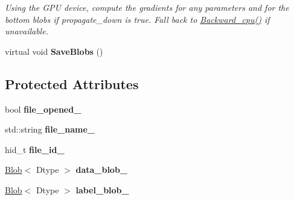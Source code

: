 \begin{DoxyCompactItemize}
\begin{DoxyCompactList}\small\item\em Using the G\+PU device, compute the gradients for any parameters and for the bottom blobs if propagate\+\_\+down is true. Fall back to \hyperlink{classcaffe_1_1HDF5OutputLayer_aaf5106f73266c501ebbb231df988f52a}{Backward\+\_\+cpu()} if unavailable. \end{DoxyCompactList}\item 
virtual void {\bfseries Save\+Blobs} ()\hypertarget{classcaffe_1_1HDF5OutputLayer_a56c7ba8e69d0867d550dddd928863a2f}{}\label{classcaffe_1_1HDF5OutputLayer_a56c7ba8e69d0867d550dddd928863a2f}

\end{DoxyCompactItemize}
\subsection*{Protected Attributes}
\begin{DoxyCompactItemize}
\item 
bool {\bfseries file\+\_\+opened\+\_\+}\hypertarget{classcaffe_1_1HDF5OutputLayer_a995b7eadf9ccd19c02a7f54ee3dd97c2}{}\label{classcaffe_1_1HDF5OutputLayer_a995b7eadf9ccd19c02a7f54ee3dd97c2}

\item 
std\+::string {\bfseries file\+\_\+name\+\_\+}\hypertarget{classcaffe_1_1HDF5OutputLayer_aa4609affd7a57ba7481b98afed3f7985}{}\label{classcaffe_1_1HDF5OutputLayer_aa4609affd7a57ba7481b98afed3f7985}

\item 
hid\+\_\+t {\bfseries file\+\_\+id\+\_\+}\hypertarget{classcaffe_1_1HDF5OutputLayer_a353a5e36b3baa08e381dc5da1bb8b74e}{}\label{classcaffe_1_1HDF5OutputLayer_a353a5e36b3baa08e381dc5da1bb8b74e}

\item 
\hyperlink{classcaffe_1_1Blob}{Blob}$<$ Dtype $>$ {\bfseries data\+\_\+blob\+\_\+}\hypertarget{classcaffe_1_1HDF5OutputLayer_ad91a29d84d4f7c577adf1b634fec1d92}{}\label{classcaffe_1_1HDF5OutputLayer_ad91a29d84d4f7c577adf1b634fec1d92}

\item 
\hyperlink{classcaffe_1_1Blob}{Blob}$<$ Dtype $>$ {\bfseries label\+\_\+blob\+\_\+}\hypertarget{classcaffe_1_1HDF5OutputLayer_aef72be0097ab1894a5414b74512e3807}{}\label{classcaffe_1_1HDF5OutputLayer_aef72be0097ab1894a5414b74512e3807}

\end{DoxyCompactItemize}


